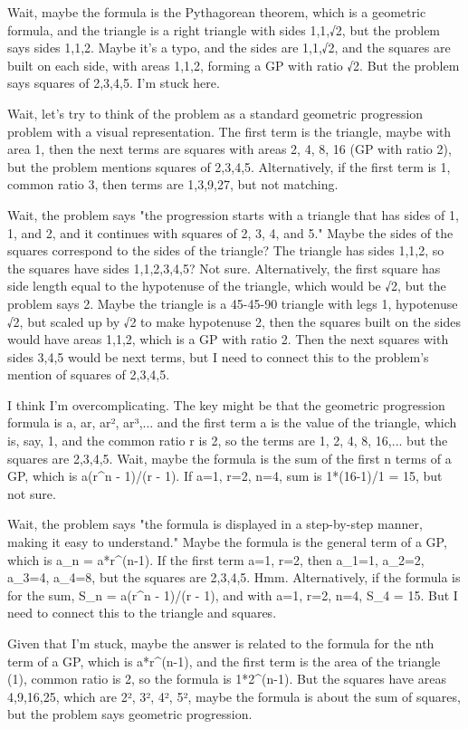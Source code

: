 Wait, maybe the formula is the Pythagorean theorem, which is a geometric formula, and the triangle is a right triangle with sides 1,1,√2, but the problem says sides 1,1,2. Maybe it's a typo, and the sides are 1,1,√2, and the squares are built on each side, with areas 1,1,2, forming a GP with ratio √2. But the problem says squares of 2,3,4,5. I'm stuck here.

Wait, let's try to think of the problem as a standard geometric progression problem with a visual representation. The first term is the triangle, maybe with area 1, then the next terms are squares with areas 2, 4, 8, 16 (GP with ratio 2), but the problem mentions squares of 2,3,4,5. Alternatively, if the first term is 1, common ratio 3, then terms are 1,3,9,27, but not matching.

Wait, the problem says "the progression starts with a triangle that has sides of 1, 1, and 2, and it continues with squares of 2, 3, 4, and 5." Maybe the sides of the squares correspond to the sides of the triangle? The triangle has sides 1,1,2, so the squares have sides 1,1,2,3,4,5? Not sure. Alternatively, the first square has side length equal to the hypotenuse of the triangle, which would be √2, but the problem says 2. Maybe the triangle is a 45-45-90 triangle with legs 1, hypotenuse √2, but scaled up by √2 to make hypotenuse 2, then the squares built on the sides would have areas 1,1,2, which is a GP with ratio 2. Then the next squares with sides 3,4,5 would be next terms, but I need to connect this to the problem's mention of squares of 2,3,4,5.

I think I'm overcomplicating. The key might be that the geometric progression formula is a, ar, ar², ar³,... and the first term a is the value of the triangle, which is, say, 1, and the common ratio r is 2, so the terms are 1, 2, 4, 8, 16,... but the squares are 2,3,4,5. Wait, maybe the formula is the sum of the first n terms of a GP, which is a(r^n - 1)/(r - 1). If a=1, r=2, n=4, sum is 1*(16-1)/1 = 15, but not sure.

Wait, the problem says "the formula is displayed in a step-by-step manner, making it easy to understand." Maybe the formula is the general term of a GP, which is a_n = a*r^(n-1). If the first term a=1, r=2, then a_1=1, a_2=2, a_3=4, a_4=8, but the squares are 2,3,4,5. Hmm. Alternatively, if the formula is for the sum, S_n = a(r^n - 1)/(r - 1), and with a=1, r=2, n=4, S_4 = 15. But I need to connect this to the triangle and squares.

Given that I'm stuck, maybe the answer is related to the formula for the nth term of a GP, which is a*r^(n-1), and the first term is the area of the triangle (1), common ratio is 2, so the formula is 1*2^(n-1). But the squares have areas 4,9,16,25, which are 2², 3², 4², 5², maybe the formula is about the sum of squares, but the problem says geometric progression.

